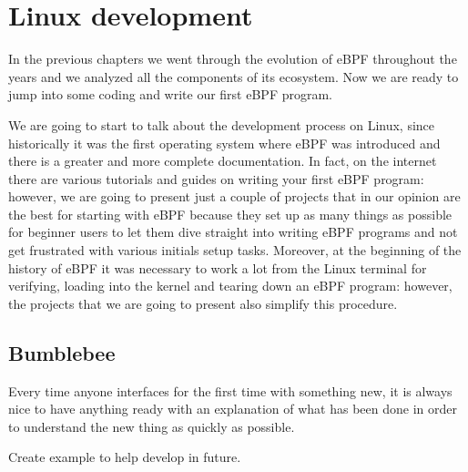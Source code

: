 \chapter{Linux development}

In the previous chapters we went through the evolution of eBPF throughout the years and we analyzed all the components of its ecosystem.
Now we are ready to jump into some coding and write our first eBPF program.

We are going to start to talk about the development process on Linux, since historically it was the first operating system where eBPF was introduced and there is a greater and more complete documentation.
In fact, on the internet there are various tutorials and guides on writing your first eBPF program: however, we are going to present just a couple of projects that in our opinion are the best for starting with eBPF because they set up as many things as possible for beginner users to let them dive straight into writing eBPF programs and not get frustrated with various initials setup tasks.
Moreover, at the beginning of the history of eBPF it was necessary to work a lot from the Linux terminal for verifying, loading into the kernel and tearing down an eBPF program: however, the projects that we are going to present also simplify this procedure.


\section{Bumblebee}


Every time anyone interfaces for the first time with something new, it is always nice to have anything ready with an explanation of what has been done in order to understand the new thing as quickly as possible.

Create example to help develop in future.

